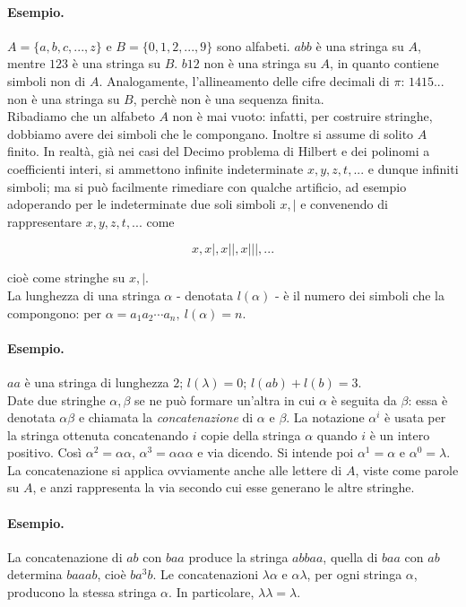 \paragraph{Esempio.} $A = \{a, b, c, ..., z\}$ e $B = \{0, 1, 2, ..., 9\}$ sono alfabeti.
$abb$ è una stringa su $A$, mentre $123$ è una stringa su $B$. $b12$ non è una stringa
su $A$, in quanto contiene simboli non di $A$. Analogamente,
l'allineamento delle cifre decimali di $\pi$: $1415...$
non è una stringa su $B$, perchè non è una sequenza finita.\\

Ribadiamo che un alfabeto $A$ non è mai vuoto: infatti, per costruire stringhe,
dobbiamo avere dei simboli che le compongano. Inoltre si assume di solito $A$ finito.
In realtà, già nei casi del Decimo problema di Hilbert e dei polinomi a
coefficienti interi, si ammettono infinite indeterminate $x, y, z, t,...$
e dunque infiniti simboli;
ma si può facilmente rimediare con qualche artificio, ad esempio adoperando per
le indeterminate due soli simboli $x, |$ e convenendo di rappresentare
$x, y, z, t,...$ come

\[
    x, x|, x||, x|||, ...
\]

cioè come stringhe su $x, |$.\\

La lunghezza di una stringa $\alpha$ - denotata $l(\alpha)$ - è il numero dei
simboli che la compongono: per $\alpha = a_1a_2 \cdots a_n, \ l(\alpha) = n$.

\paragraph{Esempio.}
$aa$ è una stringa di lunghezza $2$; $l(\lambda) = 0$; $l(ab) + l(b) = 3$.\\

Date due stringhe $\alpha, \beta$ se ne può formare un'altra in cui $\alpha$ è
seguita da $\beta$: essa è
denotata $\alpha\beta$ e chiamata la \textit{concatenazione} di $\alpha$ e $\beta$.
La notazione $\alpha^{i}$ è usata per la
stringa ottenuta concatenando $i$ copie della stringa $\alpha$ quando
$i$ è un intero positivo.
Così $\alpha^2 = \alpha\alpha$, $\alpha^3 = \alpha\alpha\alpha$ e via dicendo.
Si intende poi $\alpha^1 = \alpha $ e $\alpha^0 = \lambda$.
La concatenazione si applica ovviamente anche alle lettere di $A$,
viste come parole su $A$, e anzi rappresenta la via
secondo cui esse generano le altre stringhe.

\paragraph{Esempio.}
La concatenazione di $ab$ con $baa$ produce la stringa $abbaa$, quella di $baa$
con $ab$ determina $baaab$, cioè $ba^{3}b$. Le concatenazioni $\lambda\alpha$ e
$\alpha\lambda$, per ogni stringa $\alpha$, producono la stessa stringa $\alpha$.
In particolare, $\lambda\lambda = \lambda$.\\

